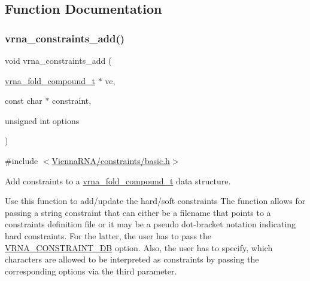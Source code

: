 \subsection{Function Documentation}
\mbox{\label{group__constraints_ga35a401f680969a556858a8dd5f1d07cc}} 
\subsubsection{\texorpdfstring{vrna\_constraints\_add()}{vrna\_constraints\_add()}}
{\footnotesize\ttfamily void vrna\+\_\+constraints\+\_\+add (\begin{DoxyParamCaption}\item[{\mbox{\hyperlink{group__fold__compound_ga1b0cef17fd40466cef5968eaeeff6166}{vrna\+\_\+fold\+\_\+compound\+\_\+t}} $\ast$}]{vc,  }\item[{const char $\ast$}]{constraint,  }\item[{unsigned int}]{options }\end{DoxyParamCaption})}



{\ttfamily \#include $<$\mbox{\hyperlink{constraints_2basic_8h}{Vienna\+R\+N\+A/constraints/basic.\+h}}$>$}



Add constraints to a \mbox{\hyperlink{group__fold__compound_ga1b0cef17fd40466cef5968eaeeff6166}{vrna\+\_\+fold\+\_\+compound\+\_\+t}} data structure. 

Use this function to add/update the hard/soft constraints The function allows for passing a string \textquotesingle{}constraint\textquotesingle{} that can either be a filename that points to a constraints definition file or it may be a pseudo dot-\/bracket notation indicating hard constraints. For the latter, the user has to pass the \mbox{\hyperlink{group__hard__constraints_ga4bfc2f15c4f261c62a11af9d2aa80c90}{V\+R\+N\+A\+\_\+\+C\+O\+N\+S\+T\+R\+A\+I\+N\+T\+\_\+\+DB}} option. Also, the user has to specify, which characters are allowed to be interpreted as constraints by passing the corresponding options via the third parameter.

